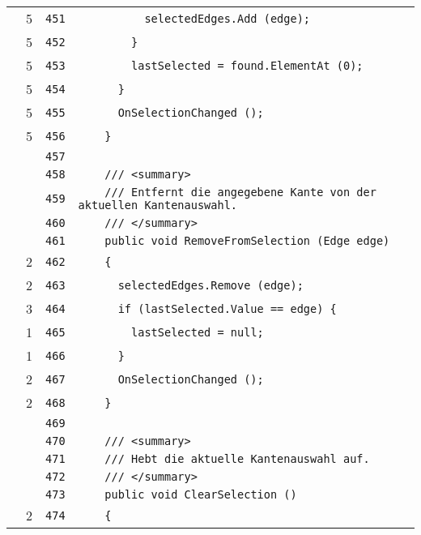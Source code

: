 \documentclass[a4paper,10pt]{article}
\begin{document}
\begin{longtable}[l]{lrrl}
\cellcolor{green} & 5 & \verb~451~ & \verb~          selectedEdges.Add (edge);~\\
\cellcolor{green} & 5 & \verb~452~ & \verb~        }~\\
\cellcolor{green} & 5 & \verb~453~ & \verb~        lastSelected = found.ElementAt (0);~\\
\cellcolor{green} & 5 & \verb~454~ & \verb~      }~\\
\cellcolor{green} & 5 & \verb~455~ & \verb~      OnSelectionChanged ();~\\
\cellcolor{green} & 5 & \verb~456~ & \verb~    }~\\
\cellcolor{gray} &  & \verb~457~ & \verb~~\\
\cellcolor{gray} &  & \verb~458~ & \verb~    /// <summary>~\\
\cellcolor{gray} &  & \verb~459~ & \verb~    /// Entfernt die angegebene Kante von der aktuellen Kantenauswahl.~\\
\cellcolor{gray} &  & \verb~460~ & \verb~    /// </summary>~\\
\cellcolor{gray} &  & \verb~461~ & \verb~    public void RemoveFromSelection (Edge edge)~\\
\cellcolor{green} & 2 & \verb~462~ & \verb~    {~\\
\cellcolor{green} & 2 & \verb~463~ & \verb~      selectedEdges.Remove (edge);~\\
\cellcolor{green} & 3 & \verb~464~ & \verb~      if (lastSelected.Value == edge) {~\\
\cellcolor{green} & 1 & \verb~465~ & \verb~        lastSelected = null;~\\
\cellcolor{green} & 1 & \verb~466~ & \verb~      }~\\
\cellcolor{green} & 2 & \verb~467~ & \verb~      OnSelectionChanged ();~\\
\cellcolor{green} & 2 & \verb~468~ & \verb~    }~\\
\cellcolor{gray} &  & \verb~469~ & \verb~~\\
\cellcolor{gray} &  & \verb~470~ & \verb~    /// <summary>~\\
\cellcolor{gray} &  & \verb~471~ & \verb~    /// Hebt die aktuelle Kantenauswahl auf.~\\
\cellcolor{gray} &  & \verb~472~ & \verb~    /// </summary>~\\
\cellcolor{gray} &  & \verb~473~ & \verb~    public void ClearSelection ()~\\
\cellcolor{green} & 2 & \verb~474~ & \verb~    {~\\

\end{longtable}
\end{document}
